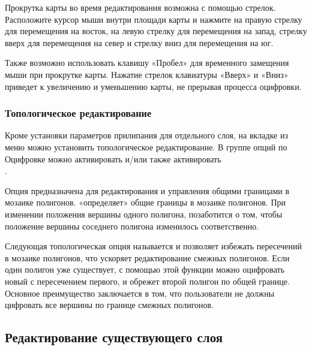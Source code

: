 Прокрутка карты во время редактирования возможна с помощью стрелок. Расположите
курсор мыши внутри площади карты и нажмите на правую стрелку для перемещения на
восток, на левую стрелку для перемещения на запад, стрелку вверх для перемещения на
север и стрелку вниз для перемещения на юг.

Также возможно использовать клавишу «Пробел» для временного замещения мыши при
прокрутке карты. Нажатие стрелок клавиатуры «Вверх» и «Вниз» приведет к
увеличению и уменьшению карты, не прерывая процесса оцифровки.

\subsubsection{Топологическое редактирование}

Кроме установки параметров прилипания для отдельного слоя, на вкладке 
из меню
 \arrow {}
можно установить топологическое редактирование. В группе опций по Оцифровке
можно активировать  и/или
также активировать \\
.


Опция  предназначена для
редактирования и управления общими границами в мозаике полигонов. \qg
«определяет» общие границы в мозаике полигонов. При изменении положения
вершины одного полигона, \qg позаботится о том, чтобы положение вершины
соседнего полигона изменилось соответственно.


Следующая топологическая опция называется  и позволяет избежать пересечений в мозаике полигонов, что
ускоряет редактирование смежных полигонов. Если один полигон уже существует,
с помощью этой функции можно оцифровать новый с пересечением первого, и
\qg обрежет второй полигон по общей границе. Основное преимущество заключается
в том, что пользователи не должны цифровать все вершины по границе смежных
полигонов.

\subsection{Редактирование существующего слоя}
\label{sec:edit_existing_layer}

